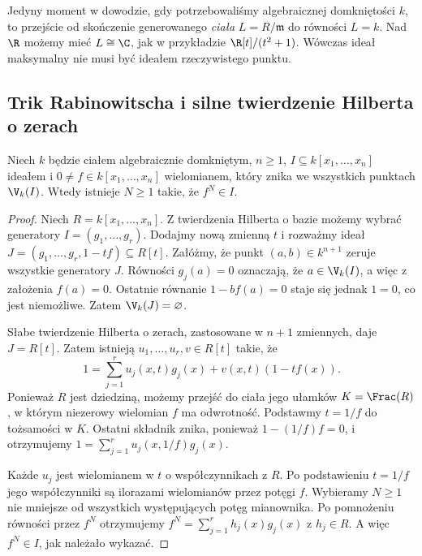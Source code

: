 \begin{uwaga}
Jedyny moment w dowodzie, gdy potrzebowaliśmy algebraicznej
domkniętości $k$, to przejście od skończenie generowanego
\emph{ciała} $L=R/\mathfrak m$ do równości $L=k$.
Nad $\R$ możemy mieć $L\cong\C$, jak w przykładzie
$\R[t]/(t^2+1)$. Wówczas ideał maksymalny nie musi być
ideałem rzeczywistego punktu.
\end{uwaga}

\subsection{Trik Rabinowitscha i silne twierdzenie Hilberta o zerach}

\begin{lemat}
\label{lem:rabinowitsch}
Niech $k$ będzie ciałem algebraicznie domkniętym, $n\ge1$,
$I\subseteq k[x_1,\dots,x_n]$ ideałem i
$0\ne f\in k[x_1,\dots,x_n]$ wielomianem, który znika
we wszystkich punktach $\V_k(I)$.
Wtedy istnieje $N\ge1$ takie, że $f^N\in I$.
\end{lemat}
\begin{proof}
Niech $R=k[x_1,\dots,x_n]$.
Z twierdzenia Hilberta o bazie możemy wybrać generatory
$I=(g_1,\dots,g_r)$. Dodajmy nową zmienną $t$ i
rozważmy ideał
$J=(g_1,\dots,g_r,1-tf)\subseteq R[t]$.
Załóżmy, że punkt $(a,b)\in k^{n+1}$ zeruje wszystkie
generatory $J$. Równości $g_j(a)=0$ oznaczają,
że $a\in\V_k(I)$, a więc z założenia $f(a)=0$.
Ostatnie równanie $1-bf(a)=0$ staje się jednak $1=0$,
co jest niemożliwe. Zatem $\V_k(J)=\varnothing$.

Słabe twierdzenie Hilberta o zerach, zastosowane w $n+1$
zmiennych, daje $J=R[t]$.
Zatem istnieją $u_1,\dots,u_r,v\in R[t]$ takie, że
\[
1=\sum_{j=1}^r u_j(x,t)g_j(x)+v(x,t)(1-tf(x)).
\]
Ponieważ $R$ jest dziedziną, możemy przejść do ciała jego
ułamków $K=\Frac(R)$, w którym niezerowy wielomian $f$
ma odwrotność. Podstawmy $t=1/f$ do tożsamości w $K$.
Ostatni składnik znika, ponieważ $1-(1/f)f=0$, i otrzymujemy
$1=\sum_{j=1}^r u_j(x,1/f)g_j(x)$.

Każde $u_j$ jest wielomianem w $t$ o współczynnikach z $R$.
Po podstawieniu $t=1/f$ jego współczynniki są ilorazami
wielomianów przez potęgi $f$. Wybieramy $N\ge1$
nie mniejsze od wszystkich występujących potęg mianownika.
Po pomnożeniu równości przez $f^N$ otrzymujemy
$f^N=\sum_{j=1}^r h_j(x)g_j(x)$ z $h_j\in R$.
A więc $f^N\in I$, jak należało wykazać.
\end{proof}

